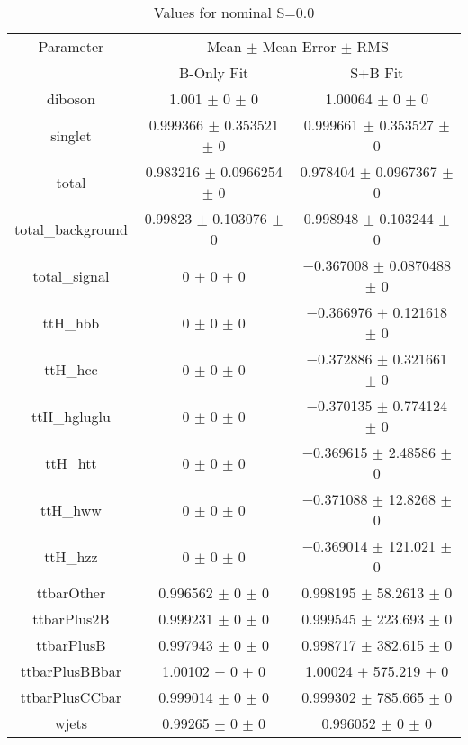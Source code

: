 \begin{table}
\centering
\caption{Values for nominal S=0.0}
\begin{tabular}{ccc}
\toprule
Parameter & \multicolumn{2}{c}{Mean $\pm$ Mean Error $\pm$ RMS}\\
 & B-Only Fit & S+B Fit\\
\midrule
diboson & \num{1.001} $\pm$ \num{0} $\pm$ \num{0} & \num{1.00064} $\pm$ \num{0} $\pm$ \num{0}\\
singlet & \num{0.999366} $\pm$ \num{0.353521} $\pm$ \num{0} & \num{0.999661} $\pm$ \num{0.353527} $\pm$ \num{0}\\
total & \num{0.983216} $\pm$ \num{0.0966254} $\pm$ \num{0} & \num{0.978404} $\pm$ \num{0.0967367} $\pm$ \num{0}\\
total\_background & \num{0.99823} $\pm$ \num{0.103076} $\pm$ \num{0} & \num{0.998948} $\pm$ \num{0.103244} $\pm$ \num{0}\\
total\_signal & \num{0} $\pm$ \num{0} $\pm$ \num{0} & \num{-0.367008} $\pm$ \num{0.0870488} $\pm$ \num{0}\\
ttH\_hbb & \num{0} $\pm$ \num{0} $\pm$ \num{0} & \num{-0.366976} $\pm$ \num{0.121618} $\pm$ \num{0}\\
ttH\_hcc & \num{0} $\pm$ \num{0} $\pm$ \num{0} & \num{-0.372886} $\pm$ \num{0.321661} $\pm$ \num{0}\\
ttH\_hgluglu & \num{0} $\pm$ \num{0} $\pm$ \num{0} & \num{-0.370135} $\pm$ \num{0.774124} $\pm$ \num{0}\\
ttH\_htt & \num{0} $\pm$ \num{0} $\pm$ \num{0} & \num{-0.369615} $\pm$ \num{2.48586} $\pm$ \num{0}\\
ttH\_hww & \num{0} $\pm$ \num{0} $\pm$ \num{0} & \num{-0.371088} $\pm$ \num{12.8268} $\pm$ \num{0}\\
ttH\_hzz & \num{0} $\pm$ \num{0} $\pm$ \num{0} & \num{-0.369014} $\pm$ \num{121.021} $\pm$ \num{0}\\
ttbarOther & \num{0.996562} $\pm$ \num{0} $\pm$ \num{0} & \num{0.998195} $\pm$ \num{58.2613} $\pm$ \num{0}\\
ttbarPlus2B & \num{0.999231} $\pm$ \num{0} $\pm$ \num{0} & \num{0.999545} $\pm$ \num{223.693} $\pm$ \num{0}\\
ttbarPlusB & \num{0.997943} $\pm$ \num{0} $\pm$ \num{0} & \num{0.998717} $\pm$ \num{382.615} $\pm$ \num{0}\\
ttbarPlusBBbar & \num{1.00102} $\pm$ \num{0} $\pm$ \num{0} & \num{1.00024} $\pm$ \num{575.219} $\pm$ \num{0}\\
ttbarPlusCCbar & \num{0.999014} $\pm$ \num{0} $\pm$ \num{0} & \num{0.999302} $\pm$ \num{785.665} $\pm$ \num{0}\\
wjets & \num{0.99265} $\pm$ \num{0} $\pm$ \num{0} & \num{0.996052} $\pm$ \num{0} $\pm$ \num{0}\\
\bottomrule
\end{tabular}
\end{table}